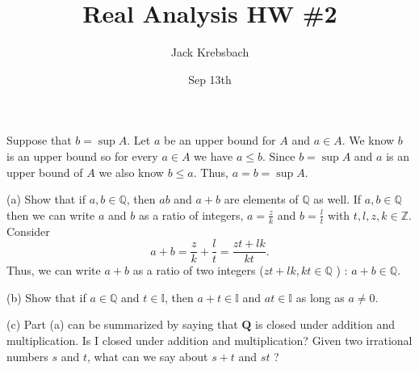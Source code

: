 \documentclass{report}
\title{Real Analysis HW \#2}
\author{Jack Krebsbach }
\date{Sep 13th}
\begin{document}
\maketitle


\begin{myproof}
Suppose that $b = \sup A$. Let $a$ be an upper bound for $A$ and $a \in A$. We know $b$ is an upper bound so for every $a \in A$ we have $a \leq b.$ Since $b = \sup A$ and $a$ is an upper bound of $A$ we also know $b \leq a$. Thus, $a = b = \sup A.$
\end{myproof}


(a) Show that if $a, b \in \mathbb{Q}$, then $a b$ and $a+b$ are elements of $\mathbb{Q}$ as well.
\sol If  $a, b \in \mathbb{Q}$ then we can write $a$ and $b$ as a ratio of integers, $a = \frac{z}{k}$ and $b= \frac{l}{t}$ with $t,l,z,k \in \mathbb{Z}.$ Consider $$
a+b = \frac{z}{k} + \frac{l}{t}= \frac{zt + lk}{kt}. 
$$
Thus, we can write $a+b$ as a ratio of two integers ($zt+lk,kt \in \mathbb{Q}$ ) : $a+b \in \mathbb{Q}$.
\par \bigskip

(b) Show that if $a \in \mathbb{Q}$ and $t \in \mathbb{I}$, then $a+t \in \mathbb{I}$ and $a t \in \mathbb{I}$ as long as $a \neq 0$.

\par \bigskip
(c) Part (a) can be summarized by saying that $\mathbf{Q}$ is closed under addition and multiplication. Is I closed under addition and multiplication? Given two irrational numbers $s$ and $t$, what can we say about $s+t$ and $s t$ ?
\par \bigskip



\end{document}
